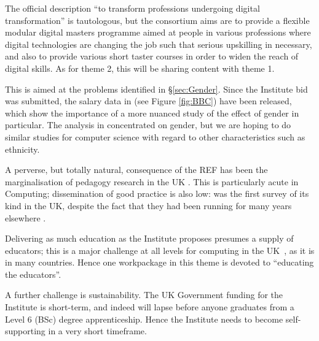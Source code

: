 \documentclass[sigconf]{acmart}
\begin{document}
 The official description ``to
transform professions undergoing digital transformation''
\cite{DfE2018a} is tautologous, but the consortium aims are to provide
a flexible modular digital masters programme aimed at people in
various professions where digital technologies are changing the job
such that serious upskilling in necessary, and also to provide various
short taster courses in order to widen the reach of digital skills. As
for theme 2, this will be sharing content with theme 1.\newline

 This is aimed at the problems
identified in \S\ref{sec:Gender}. Since the Institute bid was
submitted, the salary data in \cite{DfE2018d} (see Figure
\ref{fig:BBC}) have been released, which show the importance of a more
nuanced study of the effect of gender in particular. The analysis in
\cite{DfE2018d} concentrated on gender, but we are hoping to do
similar studies for computer science with regard to other
characteristics such as ethnicity.\newline

 A perverse, but totally
natural, consequence of the REF has been the marginalisation of
pedagogy research in the UK \cite{Cottonetal2018a}. This is
particularly acute in Computing; dissemination of good practice is
also low: \cite{murphy-et-al:programming2017} was the first survey of
its kind in the UK, despite the fact that they had been running for
many years elsewhere \cite{simon-et-al:sigcse2018}.\newline

Delivering as much education as the Institute proposes presumes a
supply of educators; this is a major challenge at all levels for
computing in the UK~\cite{brown-et-al:toce2014,moller+crick:jce2018},
as it is in many countries. Hence one workpackage
in this theme is devoted to ``educating the educators''.

A further challenge is sustainability. The UK Government funding for
the Institute is short-term, and indeed will lapse before anyone
graduates from a Level 6 (BSc) degree apprenticeship. Hence the
Institute needs to become self-supporting in a very short timeframe.
\end{document}
